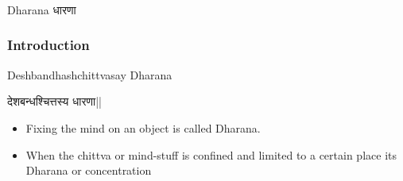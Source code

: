 \begin{frame}[fragile]\frametitle{}
\begin{center}
{\Large Dharana धारणा}
\end{center}
\end{frame}

\begin{frame}[fragile]\frametitle{Introduction}

Deshbandhashchittvasay Dharana

देशबन्धश्चित्तस्य धारणा||

	\begin{itemize}
	\item Fixing the mind on an object 
is  called  Dharana.  
	\item When  the 
chittva  or  mind-stuff  is 
confined  and  limited  to  a 
certain  place  its    Dharana  or 
concentration
	\end{itemize}

\end{frame}


